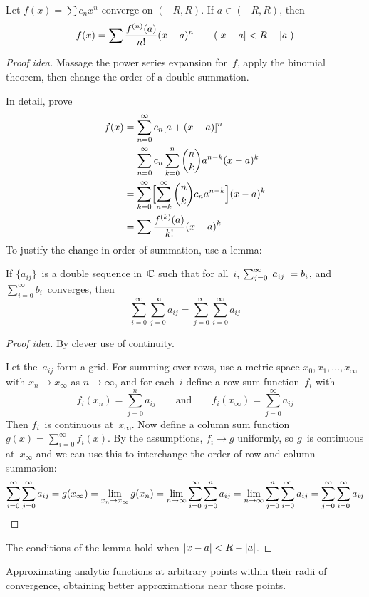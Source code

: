 \begin{thm}[Taylor]
Let \(f(x)=\sum c_n x^n\) converge on \((-R,R)\). If \(a\in(-R,R)\), then
\[f(x)=\sum\frac{f^{(n)}(a)}{n!}(x-a)^n\qquad(|{x-a}|<R-|{a}|)\]
\end{thm}
\begin{proof}[Proof idea]
Massage the power series expansion for~\(f\), apply the binomial theorem, then change the order of a double summation.

In detail, prove
\begin{align*}
f(x)&=\sum_{n=0}^\infty c_n [a+(x-a)]^n\\
	&=\sum_{n=0}^\infty c_n \sum_{k=0}^n\binom{n}{k}a^{n-k}(x-a)^k\\
	&=\sum_{k=0}^\infty\Bigl[\sum_{n=k}^\infty\binom{n}{k}c_n a^{n-k}\Bigr](x-a)^k\\
	&=\sum\frac{f^{(k)}(a)}{k!}(x-a)^k
\end{align*}
To justify the change in order of summation, use a lemma:
\begin{lem}
If \(\{a_{ij}\}\)~is a double sequence in~\(\mathbb{C}\) such that for all~\(i\), \(\sum_{j=0}^\infty|{a_{ij}}|=b_i\), and \(\sum_{i=0}^\infty b_i\)~converges, then
\[\sum_{i=0}^\infty\sum_{j=0}^\infty a_{ij}=\sum_{j=0}^\infty\sum_{i=0}^\infty a_{ij}\]
\end{lem}
\begin{proof}[Proof idea]
By clever use of continuity.

Let the~\(a_{ij}\) form a grid. For summing over rows, use a metric space \(x_0,x_1,\ldots,x_{\infty}\) with \(x_n\to x_{\infty}\) as \(n\to\infty\), and for each~\(i\) define a row sum function~\(f_i\) with
\[f_i(x_n)=\sum_{j=0}^n a_{ij}\qquad\text{and}\qquad f_i(x_{\infty})=\sum_{j=0}^\infty a_{ij}\]
Then \(f_i\)~is continuous at~\(x_{\infty}\). Now define a column sum function \(g(x)=\sum_{i=0}^\infty f_i(x)\). By the assumptions, \(f_i\to g\) uniformly, so \(g\)~is continuous at~\(x_{\infty}\) and we can use this to interchange the order of row and column summation:
\begin{equation*}
\sum_{i=0}^\infty\sum_{j=0}^\infty a_{ij}
	=g(x_{\infty})
	=\lim_{x_n\to x_{\infty}}g(x_n)
	=\lim_{n\to\infty}\sum_{i=0}^\infty \sum_{j=0}^n a_{ij}
	=\lim_{n\to\infty}\sum_{j=0}^n\sum_{i=0}^\infty a_{ij}
	=\sum_{j=0}^\infty\sum_{i=0}^\infty a_{ij}\qedhere
\end{equation*}
\end{proof}
\noindent The conditions of the lemma hold when \(|{x-a}|<R-|{a}|\).
\end{proof}
\begin{app}
Approximating analytic functions at arbitrary points within their radii of convergence, obtaining better approximations near those points.
\end{app}

